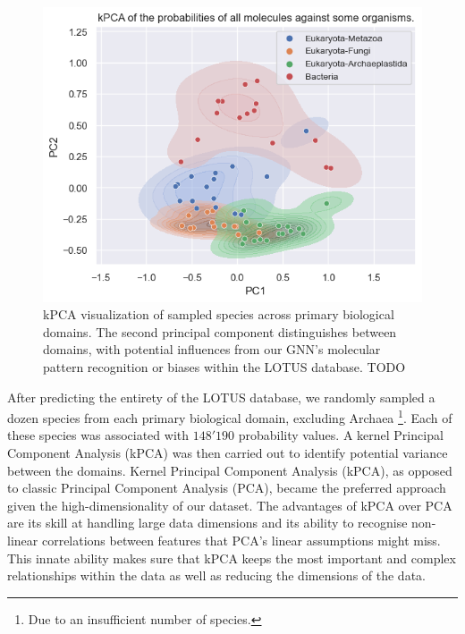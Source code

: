 \documentclass[
11pt, %
oneside, %
english, %
singlespacing, %
headsepline, %
chapterinoneline, %
]{MastersDoctoralThesis} %
\begin{document}
\begin{figure}[h]
	\centering
	\includegraphics[scale=0.7]{figure/kPCA}
	\caption{kPCA visualization of sampled species across primary biological domains. The second principal component distinguishes between domains, with potential influences from our GNN's molecular pattern recognition or biases within the LOTUS database. TODO}
	\label{fig:kPCA}
\end{figure}

After predicting the entirety of the LOTUS database, we randomly sampled a dozen species from each primary biological domain, excluding Archaea \footnote{Due to an insufficient number of species.}. Each of these species was associated with $148'190$ probability values. A kernel Principal Component Analysis (kPCA) was then carried out to identify potential variance between the domains. Kernel Principal Component Analysis (kPCA), as opposed to classic Principal Component Analysis (PCA), became the preferred approach given the high-dimensionality of our dataset. The advantages of kPCA over PCA are its skill at handling large data dimensions and its ability to recognise non-linear correlations between features that PCA's linear assumptions might miss. This innate ability makes sure that kPCA keeps the most important and complex relationships within the data as well as reducing the dimensions of the data.
\end{document}
